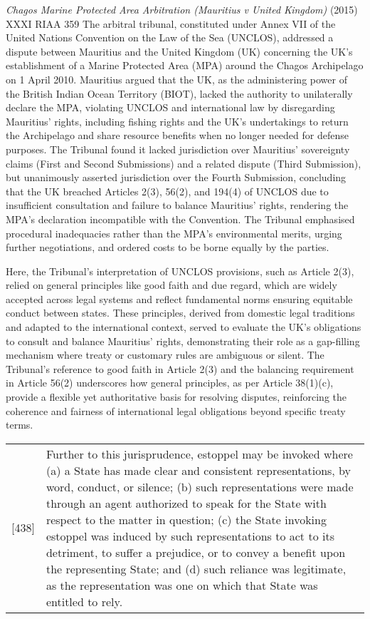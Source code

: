 \begin{casedetails}{\textit{Chagos Marine Protected Area Arbitration (Mauritius v United Kingdom)} (2015) XXXI RIAA 359}
    \flushleft
    The arbitral tribunal, constituted under Annex VII of the United Nations Convention on the Law of the Sea (UNCLOS), addressed a dispute between Mauritius and the United Kingdom (UK) concerning the UK's establishment of a Marine Protected Area (MPA) around the Chagos Archipelago on 1 April 2010. Mauritius argued that the UK, as the administering power of the British Indian Ocean Territory (BIOT), lacked the authority to unilaterally declare the MPA, violating UNCLOS and international law by disregarding Mauritius' rights, including fishing rights and the UK's undertakings to return the Archipelago and share resource benefits when no longer needed for defense purposes. The Tribunal found it lacked jurisdiction over Mauritius' sovereignty claims (First and Second Submissions) and a related dispute (Third Submission), but unanimously asserted jurisdiction over the Fourth Submission, concluding that the UK breached Articles 2(3), 56(2), and 194(4) of UNCLOS due to insufficient consultation and failure to balance Mauritius' rights, rendering the MPA's declaration incompatible with the Convention. The Tribunal emphasised procedural inadequacies rather than the MPA's environmental merits, urging further negotiations, and ordered costs to be borne equally by the parties.

    \vspace{\baselineskip}

    Here, the Tribunal's interpretation of UNCLOS provisions, such as Article 2(3), relied on general principles like good faith and due regard, which are widely accepted across legal systems and reflect fundamental norms ensuring equitable conduct between states. These principles, derived from domestic legal traditions and adapted to the international context, served to evaluate the UK's obligations to consult and balance Mauritius' rights, demonstrating their role as a gap-filling mechanism where treaty or customary rules are ambiguous or silent. The Tribunal's reference to good faith in Article 2(3) and the balancing requirement in Article 56(2) underscores how general principles, as per Article 38(1)(c), provide a flexible yet authoritative basis for resolving disputes, reinforcing the coherence and fairness of international legal obligations beyond specific treaty terms.

    \begin{longtable}{r|>{\raggedright\arraybackslash}p{}}
        [438] & Further to this jurisprudence, estoppel may be invoked where (a) a State has made clear and consistent representations, by word, conduct, or silence; (b) such representations were made through an agent authorized to speak for the State with respect to the matter in question; (c) the State invoking estoppel was induced by such representations to act to its detriment, to suffer a prejudice, or to convey a benefit upon the representing State; and (d) such reliance was legitimate, as the representation was one on which that State was entitled to rely.
    \end{longtable}  


\end{casedetails}

